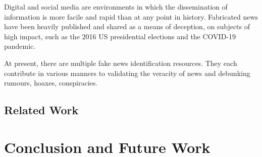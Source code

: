 \documentclass[12pt, a4paper]{article}
\begin{document}
  Digital and social media are environments in which the dissemination of information is more facile and rapid than at any point in history. Fabricated news have been heavily published and shared as a means of deception, on subjects of high impact, such as the 2016 US presidential elections and the COVID-19 pandemic.

  At present, there are multiple fake news identification resources. They each contribute in various manners to validating the veracity of news and debunking rumours, hoaxes, conspiracies.


  \subsection{Related Work}
  \newpage

  


  \section{Conclusion and Future Work}
  \newpage

  
  
  \nocite{*}
\end{document}
